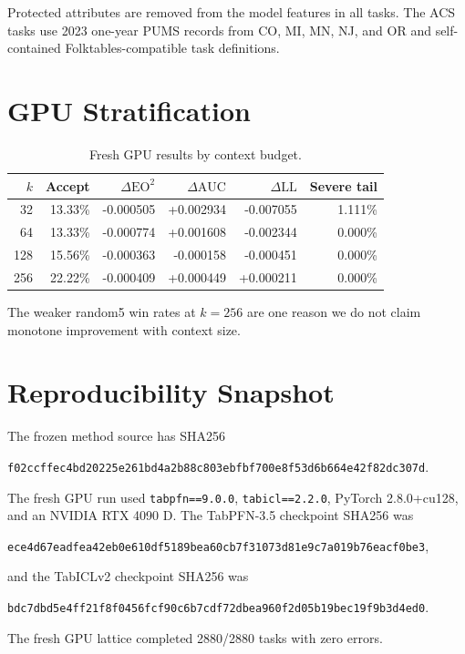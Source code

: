 \documentclass[10pt]{article}
\newcommand{\eo}{\mathrm{EO}^2}
\newcommand{\AUC}{\mathrm{AUC}}
\newcommand{\LL}{\mathrm{LL}}
\begin{document}
Protected attributes are removed from the model features in all tasks.
The ACS tasks use 2023 one-year PUMS records from CO, MI, MN, NJ, and OR and self-contained Folktables-compatible task definitions.

\section{GPU Stratification}

\begin{table}[h]
\centering
\caption{Fresh GPU results by context budget.}
\label{tab:budget}
\small
\begin{tabular}{rrrrrr}
\toprule
$k$ & Accept & $\Delta\eo$ & $\Delta\AUC$ & $\Delta\LL$ & Severe tail \\
\midrule
32 & 13.33\% & -0.000505 & +0.002934 & -0.007055 & 1.111\% \\
64 & 13.33\% & -0.000774 & +0.001608 & -0.002344 & 0.000\% \\
128 & 15.56\% & -0.000363 & -0.000158 & -0.000451 & 0.000\% \\
256 & 22.22\% & -0.000409 & +0.000449 & +0.000211 & 0.000\% \\
\bottomrule
\end{tabular}
\end{table}

The weaker random5 win rates at $k=256$ are one reason we do not claim monotone improvement with context size.

\section{Reproducibility Snapshot}

The frozen method source has SHA256
\begin{center}
\footnotesize\texttt{f02ccffec4bd20225e261bd4a2b88c803ebfbf700e8f53d6b664e42f82dc307d}.
\end{center}
The fresh GPU run used \texttt{tabpfn==9.0.0}, \texttt{tabicl==2.2.0}, PyTorch 2.8.0+cu128, and an NVIDIA RTX 4090 D.
The TabPFN-3.5 checkpoint SHA256 was
\begin{center}
\footnotesize\texttt{ece4d67eadfea42eb0e610df5189bea60cb7f31073d81e9c7a019b76eacf0be3},
\end{center}
and the TabICLv2 checkpoint SHA256 was
\begin{center}
\footnotesize\texttt{bdc7dbd5e4ff21f8f0456fcf90c6b7cdf72dbea960f2d05b19bec19f9b3d4ed0}.
\end{center}
The fresh GPU lattice completed 2880/2880 tasks with zero errors.
\end{document}
